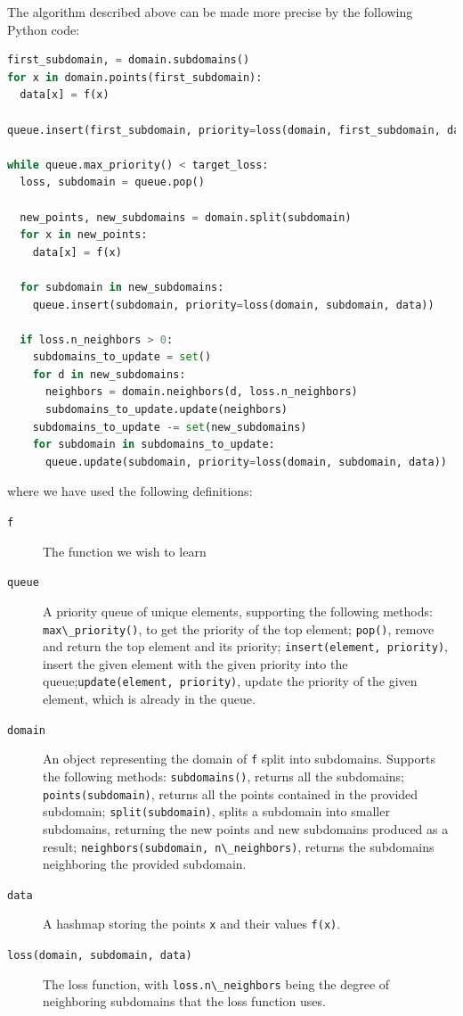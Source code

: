 
The algorithm described above can be made more precise by the following Python code:

\begin{lstlisting}[language=Python]
first_subdomain, = domain.subdomains()
for x in domain.points(first_subdomain):
  data[x] = f(x)

queue.insert(first_subdomain, priority=loss(domain, first_subdomain, data))

while queue.max_priority() < target_loss:
  loss, subdomain = queue.pop()

  new_points, new_subdomains = domain.split(subdomain)
  for x in new_points:
    data[x] = f(x)

  for subdomain in new_subdomains:
    queue.insert(subdomain, priority=loss(domain, subdomain, data))

  if loss.n_neighbors > 0:
    subdomains_to_update = set()
    for d in new_subdomains:
      neighbors = domain.neighbors(d, loss.n_neighbors)
      subdomains_to_update.update(neighbors)
    subdomains_to_update -= set(new_subdomains)
    for subdomain in subdomains_to_update:
      queue.update(subdomain, priority=loss(domain, subdomain, data))
\end{lstlisting}

where we have used the following definitions:

\begin{description}
\item[\texttt{f}]
The function we wish to learn
\item[\texttt{queue}]
A priority queue of unique elements, supporting the following methods: \passthrough{\lstinline!max\_priority()!}, to get the priority of the top element; \passthrough{\lstinline!pop()!}, remove and return the top element and its priority; \passthrough{\lstinline!insert(element, priority)!}, insert the given element with the given priority into the queue;\passthrough{\lstinline!update(element, priority)!}, update the priority of the given element, which is already in the queue.
\item[\texttt{domain}]
An object representing the domain of \passthrough{\lstinline!f!} split into subdomains. Supports the following methods: \passthrough{\lstinline!subdomains()!}, returns all the subdomains; \passthrough{\lstinline!points(subdomain)!}, returns all the points contained in the provided subdomain; \passthrough{\lstinline!split(subdomain)!}, splits a subdomain into smaller subdomains, returning the new points and new subdomains produced as a result; \passthrough{\lstinline!neighbors(subdomain, n\_neighbors)!}, returns the subdomains neighboring the provided subdomain.
\item[\texttt{data}]
A hashmap storing the points \passthrough{\lstinline!x!} and their values \passthrough{\lstinline!f(x)!}.
\item[\texttt{loss(domain,\ subdomain,\ data)}]
The loss function, with \passthrough{\lstinline!loss.n\_neighbors!} being the degree of neighboring subdomains that the loss function uses.
\end{description}

